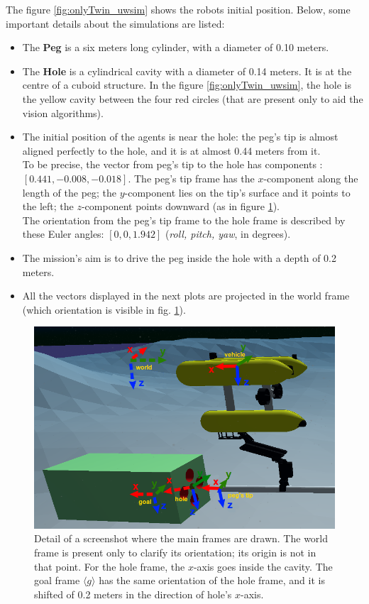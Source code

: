 The figure \ref{fig:onlyTwin_uwsim} shows the robots initial position. Below, some important details about the simulations are listed:
\begin{itemize}
	\item The \textbf{Peg} is a six meters long cylinder, with a diameter of 0.10 meters.
	\item The \textbf{Hole} is a cylindrical cavity with a diameter of 0.14 meters. It is at the centre of a cuboid structure. In the figure \ref{fig:onlyTwin_uwsim}, the hole is the yellow cavity between the four red circles (that are present only to aid the vision algorithms).
	\item The initial position of the agents is near the hole: the peg's tip is almost aligned perfectly to the hole, and it is at almost 0.44 meters from it.\\
	To be precise, the vector from peg's tip to the hole has components :\\ $[0.441, -0.008, -0.018]$. The peg's tip frame has the $x$-component along the length of the peg; the \mbox{$y$-component} lies on the tip's surface and it points to the left; the $z$-component points downward (as in figure \ref{fig:scenario_frames}).\\
	The orientation from the peg's tip frame to the hole frame is described by these Euler angles: $[0, 0, 1.942]$ (\textit{roll, pitch, yaw}, in degrees).
	\item The mission's aim is to drive the peg inside the hole with a depth of 0.2 meters.
	\item All the vectors displayed in the next plots are projected in the world frame (which orientation is visible in fig. \ref{fig:scenario_frames}).
\end{itemize}
\begin{figure}[H]
	\centering
	\includegraphics[width=12.5cm]{scenario_framesCrop.png}	
	\caption[Main frames related to the insertion phase]{Detail of a screenshot where the main frames are drawn. The world frame is present only to clarify its orientation; its origin is not in that point. For the hole frame, the $x$-axis goes inside the cavity. The goal frame $\langle g \rangle$ has the same orientation of the hole frame, and it is shifted of 0.2 meters in the direction of hole's $x$-axis.}
	\label{fig:scenario_frames}
\end{figure}

